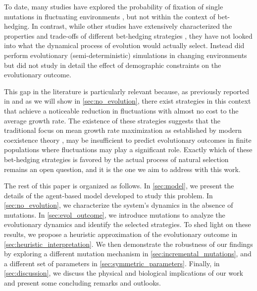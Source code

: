 \documentclass[aps,pre,reprint,10pt,superscriptaddress]{revtex4-2}
\begin{document}
To date, many studies have explored the probability of fixation of single mutations in fluctuating environments \cite{ashcroftFixationFinitePopulations2014,saakianAlleleFixationProbability2019,kaushikTimeFixationChanging2021,askerFixationExtinctionTimefluctuating2025,liuParrondolikeEvolutionaryAdvantage2026}, but not within the context of bet-hedging. In contrast, while other studies have extensively characterized the properties and trade-offs of different bet-hedging strategies \cite{kussellPhenotypicDiversityPopulation2005,beleteOptimalityAdaptationPhenotypically2015,huftonPhenotypicSwitchingPopulations2018,villamartinBethedgingStrategiesExpanding2019,dinisParetooptimalTradeoffPhenotypic2022}, they have not looked into what the dynamical process of evolution would actually select. Instead \cite{patraEmergencePhenotypeSwitching2015} did perform evolutionary (semi-deterministic) simulations in changing environments but did not study in detail the effect of demographic constraints on the evolutionary outcome.

This gap in the literature is particularly relevant because, as previously reported in \cite{dinisPhaseTransitionsOptimal2020,dinisParetooptimalTradeoffPhenotypic2022} and as we will show in \cref{sec:no_evolution}, there exist strategies in this context that achieve a noticeable reduction in fluctuations with almost no cost to the average growth rate. The existence of these strategies suggests that the traditional focus on mean growth rate maximization as established by modern coexistence theory \cite{chessonMultispeciesCompetitionVariable1994,barabasChessonsCoexistenceTheory2018}, may be insufficient to predict evolutionary outcomes in finite populations where fluctuations may play a significant role. Exactly which of these bet-hedging strategies is favored by the actual process of natural selection remains an open question, and it is the one we aim to address with this work.

The rest of this paper is organized as follows. In \cref{sec:model}, we present the details of the agent-based model developed to study this problem. In \cref{sec:no_evolution}, we characterize the system's dynamics in the absence of mutations. In \cref{sec:evol_outcome}, we introduce mutations to analyze the evolutionary dynamics and identify the selected strategies. To shed light on these results, we propose a heuristic approximation of the evolutionary outcome in \cref{sec:heuristic_interpretation}. We then demonstrate the robustness of our findings by exploring a different mutation mechanism in \cref{sec:incremental_mutations}, and a different set of parameters in \cref{sec:symmetric_parameters}. Finally, in \cref{sec:discussion}, we discuss the physical and biological implications of our work and present some concluding remarks and outlooks.
\end{document}

